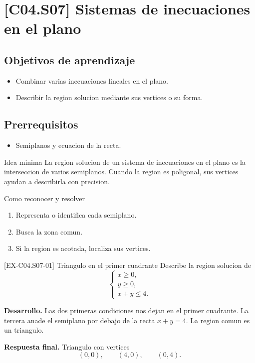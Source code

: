 \section{[C04.S07] Sistemas de inecuaciones en el plano}

\subsection*{Objetivos de aprendizaje}
\begin{itemize}
  \item Combinar varias inecuaciones lineales en el plano.
  \item Describir la region solucion mediante sus vertices o su forma.
\end{itemize}

\subsection*{Prerrequisitos}
\begin{itemize}
  \item Semiplanos y ecuacion de la recta.
\end{itemize}

\begin{theorybox}{Idea minima}
La region solucion de un sistema de inecuaciones en el plano es la interseccion de varios
semiplanos. Cuando la region es poligonal, sus vertices ayudan a describirla con precision.
\end{theorybox}

\begin{methodbox}{Como reconocer y resolver}
\begin{enumerate}
  \item Representa o identifica cada semiplano.
  \item Busca la zona comun.
  \item Si la region es acotada, localiza sus vertices.
\end{enumerate}
\end{methodbox}

\begin{solvedexample}{[EX-C04.S07-01] Triangulo en el primer cuadrante}
Describe la region solucion de
\[
\begin{cases}
x\geq 0,\\
y\geq 0,\\
x+y\leq 4.
\end{cases}
\]

\textbf{Desarrollo.} Las dos primeras condiciones nos dejan en el primer cuadrante. La tercera
anade el semiplano por debajo de la recta \(x+y=4\). La region comun es un triangulo.

\textbf{Respuesta final.}
Triangulo con vertices
\[
(0,0),\qquad (4,0),\qquad (0,4).
\]
\end{solvedexample}

